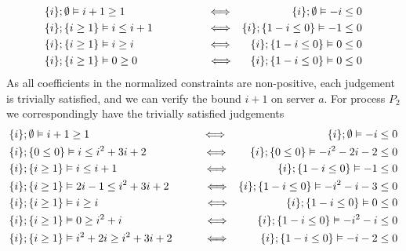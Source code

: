 \begin{example}
%
\begin{align*}
    &\{i\};\emptyset\vDash i + 1 \geq 1\kern7.5em\Longleftrightarrow &  \{i\};\emptyset\vDash -i \leq 0\\
    &\{i\};\{i \geq 1\} \vDash i \leq i + 1\kern5em\Longleftrightarrow &  \{i\};\{1-i \leq 0\} \vDash -1 \leq 0\\
    &\{i\};\{i \geq 1\} \vDash i \geq i\kern6.7em\Longleftrightarrow &  \{i\};\{1-i \leq 0\} \vDash 0 \leq 0\\
    &\{i\};\{i \geq 1\} \vDash 0 \geq 0\kern6.45em\Longleftrightarrow &  \{i\};\{1-i \leq 0\} \vDash 0 \leq 0
\end{align*}
%
As all coefficients in the normalized constraints are non-positive, each judgement is trivially satisfied, and we can verify the bound $i + 1$ on server $a$. For process $P_2$ we correspondingly have the trivially satisfied judgements
\begin{align*}
    &\{i\};\emptyset\vDash i + 1 \geq 1\kern10.3em\Longleftrightarrow &  \{i\};\emptyset\vDash -i \leq 0\\
    &\{i\};\{0 \leq 0\}\vDash i \leq i^2 + 3i + 2\kern5.2em\Longleftrightarrow &  \{i\};\{0\leq 0\}\vDash -i^2-2i-2 \leq 0\\
    &\{i\};\{i \geq 1\} \vDash i \leq i + 1\kern7.9em\Longleftrightarrow &  \{i\};\{1-i \leq 0\} \vDash -1 \leq 0\\
    &\{i\};\{i \geq 1\} \vDash 2i-1 \leq i^2 + 3i + 2\kern3.2em\Longleftrightarrow &  \{i\};\{1-i \leq 0\} \vDash -i^2-i-3 \leq 0\\
    &\{i\};\{i \geq 1\} \vDash i \geq i\kern9.7em\Longleftrightarrow &  \{i\};\{1-i \leq 0\} \vDash 0 \leq 0\\
    &\{i\};\{i \geq 1\} \vDash 0 \geq i^2+i\kern7.5em\Longleftrightarrow &  \{i\};\{1-i \leq 0\} \vDash -i^2-i \leq 0\\
    &\{i\};\{i \geq 1\} \vDash i^2+2i \geq i^2+3i+2\kern2.9em\Longleftrightarrow &  \{i\};\{1-i \leq 0\} \vDash -i-2 \leq 0
\end{align*}

\end{example}

